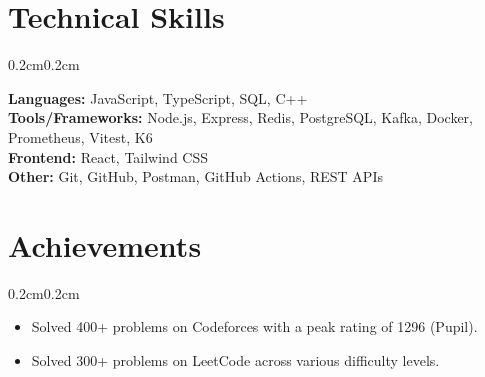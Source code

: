 \documentclass[10pt, letterpaper]{article}
\newenvironment{highlights}{
    \begin{itemize}[
        topsep=0.1cm,
        parsep=0.05cm,
        partopsep=0pt,
        itemsep=0cm, %
        leftmargin=0.4cm + 10pt
    ]
}{
    \end{itemize}
}
\newenvironment{onecolentry}{
    \begin{adjustwidth}{0.2cm}{0.2cm}
}{
    \end{adjustwidth}
}
\begin{document}
%
%
\section{Technical Skills}
\begin{onecolentry}
\textbf{Languages:} JavaScript, TypeScript, SQL, C++ \\
\textbf{Tools/Frameworks:} Node.js, Express, Redis, PostgreSQL, Kafka, Docker, Prometheus, Vitest, K6 \\
\textbf{Frontend:} React, Tailwind CSS \\
\textbf{Other:} Git, GitHub, Postman, GitHub Actions, REST APIs
\end{onecolentry}


%
%
\section{Achievements}
\begin{onecolentry}
    \begin{highlights}
        \item Solved 400+ problems on Codeforces with a peak rating of 1296 (Pupil).
        \item Solved 300+ problems on LeetCode across various difficulty levels.
    \end{highlights}
\end{onecolentry}
\end{document}
